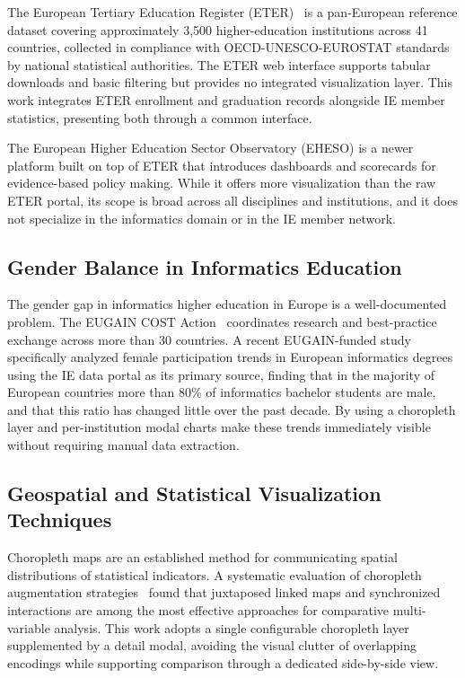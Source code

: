 \documentclass[final,3p,times,twocolumn]{elsarticle}
\begin{document}
The European Tertiary Education Register (ETER)~\cite{Lepori2023} is a pan-European reference dataset covering approximately 3,500 higher-education institutions across 41 countries, collected in compliance with OECD-UNESCO-EUROSTAT standards by national statistical authorities. The ETER web interface supports tabular downloads and basic filtering but provides no integrated visualization layer. This work integrates ETER enrollment and graduation records alongside IE member statistics, presenting both through a common interface.

The European Higher Education Sector Observatory (EHESO) is a newer platform built on top of ETER that introduces dashboards and scorecards for evidence-based policy making. While it offers more visualization than the raw ETER portal, its scope is broad across all disciplines and institutions, and it does not specialize in the informatics domain or in the IE member network.

\subsection{Gender Balance in Informatics Education}

The gender gap in informatics higher education in Europe is a well-documented problem. The EUGAIN COST Action~\cite{EUGAIN2024} coordinates research and best-practice exchange across more than 30 countries. A recent EUGAIN-funded study~\cite{DAngelo2024} specifically analyzed female participation trends in European informatics degrees using the IE data portal as its primary source, finding that in the majority of European countries more than 80\% of informatics bachelor students are male, and that this ratio has changed little over the past decade. By using a choropleth layer and per-institution modal charts make these trends immediately visible without requiring manual data extraction.

\subsection{Geospatial and Statistical Visualization Techniques}

Choropleth maps are an established method for communicating spatial distributions of statistical indicators. A systematic evaluation of choropleth augmentation strategies~\cite{Choropleth2020} found that juxtaposed linked maps and synchronized interactions are among the most effective approaches for comparative multi-variable analysis. This work adopts a single configurable choropleth layer supplemented by a detail modal, avoiding the visual clutter of overlapping encodings while supporting comparison through a dedicated side-by-side view.
\end{document}
